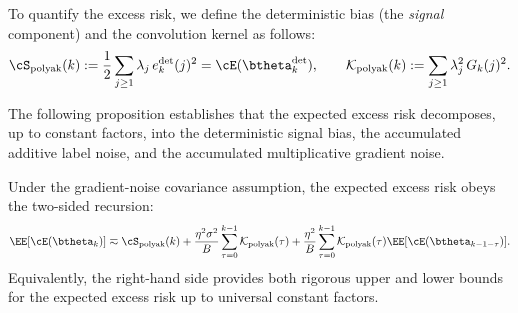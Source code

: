 \documentclass[11pt]{article}
\newcommand{\polyak}{\mathrm{polyak}}
\begin{document}
To quantify the excess risk, we define the deterministic bias (the \textit{signal} component) and the convolution kernel as follows:
\[
    \cS_{\polyak}(k) := \frac{1}{2}\sum_{j\ge1}\lambda_j\,e_k^{\mathrm{det}}(j)^2 = \cE(\btheta_k^{\mathrm{det}}),
    \qquad
    \mathcal K_{\polyak}(k) := \sum_{j\ge1}\lambda_j^2\,G_k(j)^2.
\]

The following proposition establishes that the expected excess risk decomposes, up to constant factors, into the deterministic signal bias, the accumulated additive label noise, and the accumulated multiplicative gradient noise.

\begin{proposition}
\label{prop:pol_risk_recursion}
Under the gradient-noise covariance assumption, the expected excess risk obeys the two-sided recursion:
\begin{equation} \label{eq:pol_risk_recursion_form}
    \EE[\cE(\btheta_k)]
    \eqsim
    \cS_{\polyak}(k)
    +
    \frac{\eta^2\sigma^2}{B}\sum_{\tau=0}^{k-1}\mathcal{K}_{\polyak}(\tau)
    +
    \frac{\eta^2}{B}\sum_{\tau=0}^{k-1}\mathcal{K}_{\polyak}(\tau)\EE[\cE(\btheta_{k-1-\tau})].
\end{equation}
Equivalently, the right-hand side provides both rigorous upper and lower bounds for the expected excess risk up to universal constant factors.
\end{proposition}
\end{document}
